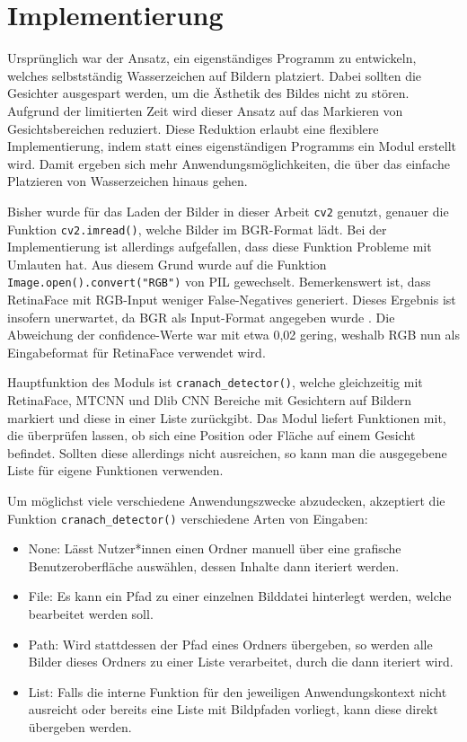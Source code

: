 \chapter{Implementierung}
%
Ursprünglich war der Ansatz, ein eigenständiges Programm zu entwickeln, welches selbstständig Wasserzeichen auf Bildern platziert. Dabei sollten die Gesichter ausgespart werden, um die Ästhetik des Bildes nicht zu stören. Aufgrund der limitierten Zeit wird dieser Ansatz auf das Markieren von Gesichtsbereichen reduziert. Diese Reduktion erlaubt eine flexiblere Implementierung, indem statt eines eigenständigen Programms ein Modul erstellt wird. Damit ergeben sich mehr Anwendungsmöglichkeiten, die über das einfache Platzieren von Wasserzeichen hinaus gehen.

Bisher wurde für das Laden der Bilder in dieser Arbeit \texttt{cv2} genutzt, genauer die Funktion \texttt{cv2.imread()}, welche Bilder im BGR-Format lädt. Bei der Implementierung ist allerdings aufgefallen, dass diese Funktion Probleme mit Umlauten hat. Aus diesem Grund wurde auf die Funktion \texttt{Image.open().convert("RGB")} von PIL gewechselt. Bemerkenswert ist, dass RetinaFace mit RGB-Input weniger False-Negatives generiert. Dieses Ergebnis ist insofern unerwartet, da BGR als Input-Format angegeben wurde \parencite{lizardNttstar25}. Die Abweichung der \gls{confidence}-Werte war mit etwa 0{,}02 gering, weshalb RGB nun als Eingabeformat für RetinaFace verwendet wird.

Hauptfunktion des Moduls ist \texttt{cranach\_detector()}, welche gleichzeitig mit RetinaFace, MTCNN und Dlib CNN Bereiche mit Gesichtern auf Bildern markiert und diese in einer Liste zurückgibt. Das Modul liefert Funktionen mit, die überprüfen lassen, ob sich eine Position oder Fläche auf einem Gesicht befindet. Sollten diese allerdings nicht ausreichen, so kann man die ausgegebene Liste für eigene Funktionen verwenden.

Um möglichst viele verschiedene Anwendungszwecke abzudecken, akzeptiert die Funktion \texttt{cranach\_detector()} verschiedene Arten von Eingaben:
\begin{itemize}
  \item None: Lässt Nutzer*innen einen Ordner manuell über eine grafische Benutzeroberfläche auswählen, dessen Inhalte dann iteriert werden.
  \item File: Es kann ein Pfad zu einer einzelnen Bilddatei hinterlegt werden, welche bearbeitet werden soll.
  \item Path: Wird stattdessen der Pfad eines Ordners übergeben, so werden alle Bilder dieses Ordners zu einer Liste verarbeitet, durch die dann iteriert wird.
  \item List: Falls die interne Funktion für den jeweiligen Anwendungskontext nicht ausreicht oder bereits eine Liste mit Bildpfaden vorliegt, kann diese direkt übergeben werden.
\end{itemize}

